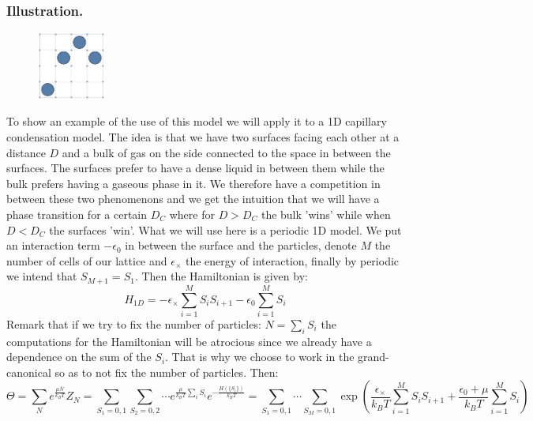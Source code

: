 \documentclass[10pt,a4paper]{book}
\begin{document}
\subsubsection{Illustration.}
\begin{figure}
\includegraphics[width = 0.2\textwidth]{graphs/ExampleCappillary}
\end{figure}
To show an example of the use of this model we will apply it to a 1D capillary condensation model. The idea is that we have two surfaces facing each other at a distance $D$ and a bulk of gas on the side connected to the space in between the surfaces. The surfaces prefer to have a dense liquid in between them while the bulk prefers having a gaseous phase in it. We therefore have a competition in between these two phenomenons and we get the intuition that we will have a phase transition for a certain $D_C$ where for $D > D_C$ the bulk 'wins'  while when $D < D_C$ the surfaces 'win'. What we will use here is a periodic 1D model. We put an interaction term $-\epsilon_0$ in between the surface and the particles, denote $M$ the number of cells of our lattice and $\epsilon_\times$ the energy of interaction, finally by periodic we intend that $S_{M+1} = S_1$. Then the Hamiltonian is given by:
\[
H_{1D} = -\epsilon_\times \sum_{i = 1}^M S_i S_{i +1} - \epsilon_0\sum_{i = 1}^M S_i
\]
Remark that if we try to fix the number of particles: $N = \sum_i S_i$ the computations for the Hamiltonian will be atrocious since we already have a dependence on the sum of the $S_i$. That is why we choose to work in the grand-canonical so as to not fix the number of particles. Then:
\[
\Theta = \sum_N e^{\frac{\mu N}{k_B T}} Z_N = \sum_{S_1 = 0, 1} \sum_{S_2 = 0, 2} \cdots e^{\frac{\mu}{k_B T} \sum_i S_i} e^{- \frac{H(\{S_i\})}{k_B T}} = \sum_{S_1 = 0, 1}\cdots \sum_{S_M = 0,1} \exp(\frac{\epsilon_\times}{k_B T} \sum_{i = 1}^M S_i S_{i + 1} + \frac{\epsilon_0 + \mu}{k_B T}\sum_{i = 1}^M S_i)
\]
\end{document}
